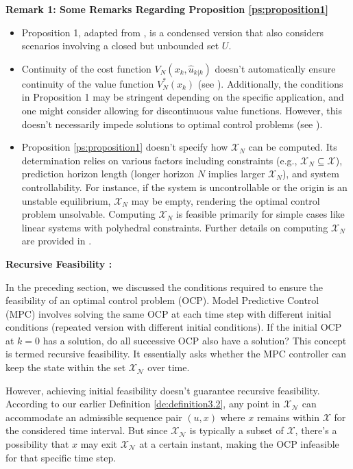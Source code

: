 \textbf{Remark 1: Some Remarks Regarding Proposition \ref{ps:proposition1}}
\begin{itemize}
    \item Proposition 1, adapted from \cite{rawlings2009model}, is a condensed version that also considers scenarios involving a closed but unbounded set $U$.
    \item Continuity of the cost function $V_N(x_k, \hat{u}_{k|k})$ doesn't automatically ensure continuity of the value function $V^*_N(x_k)$ (see \cite{rawlings2009model}). Additionally, the conditions in Proposition 1 may be stringent depending on the specific application, and one might consider allowing for discontinuous value functions. However, this doesn't necessarily impede solutions to optimal control problems (see \cite{allan2017inherent,grimm2007nominally,rawlings2009model}).
    \item Proposition \ref{ps:proposition1} doesn't specify how $\mathcal{X}_N$ can be computed. Its determination relies on various factors including constraints (e.g., $\mathcal{X}_N \subseteq \mathcal{X}$), prediction horizon length (longer horizon $N$ implies larger $\mathcal{X}_N$), and system controllability. For instance, if the system is uncontrollable or the origin is an unstable equilibrium, $\mathcal{X}_N$ may be empty, rendering the optimal control problem unsolvable. Computing $\mathcal{X}_N$ is feasible primarily for simple cases like linear systems with polyhedral constraints. Further details on computing $\mathcal{X}_N$ are provided in \cite{blanchini2008set,rawlings2009model}.
\end{itemize}

\textbf{Recursive Feasibility :}

In the preceding section, we discussed the conditions required to ensure the feasibility of an optimal control problem (OCP). Model Predictive Control (MPC) involves solving the same OCP at each time step with different initial conditions (repeated version with different initial conditions). If the initial OCP at \( k = 0 \) has a solution, do all successive OCP also have a solution? This concept is termed recursive feasibility. It essentially asks whether the MPC controller can keep the state within the set \(\mathcal{X_N} \) over time.

However, achieving initial feasibility doesn't guarantee recursive feasibility. According to our earlier Definition \ref{de:definition3.2}, any point in \( \mathcal{X_N} \) can accommodate an admissible sequence pair \((u, x)\) where \( x \) remains within \( \mathcal{X} \) for the considered time interval. But since \( \mathcal{X_N} \) is typically a subset of \( \mathcal{X} \), there's a possibility that \( x \) may exit \( \mathcal{X_N} \) at a certain instant, making the OCP infeasible for that specific time step.

